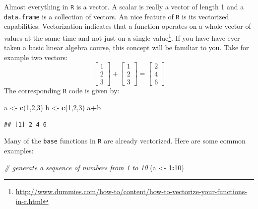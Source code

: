 \documentclass[]{book}
\makeatletter
\newenvironment{Shaded}{\begin{snugshade}}{\end{snugshade}}
\newcommand{\KeywordTok}[1]{\textcolor[rgb]{0.13,0.29,0.53}{\textbf{#1}}}
\newcommand{\DecValTok}[1]{\textcolor[rgb]{0.00,0.00,0.81}{#1}}
\newcommand{\StringTok}[1]{\textcolor[rgb]{0.31,0.60,0.02}{#1}}
\newcommand{\CommentTok}[1]{\textcolor[rgb]{0.56,0.35,0.01}{\textit{#1}}}
\newcommand{\OperatorTok}[1]{\textcolor[rgb]{0.81,0.36,0.00}{\textbf{#1}}}
\newcommand{\NormalTok}[1]{#1}
\let\rmarkdownfootnote\footnote%
\def\footnote{\protect\rmarkdownfootnote}
\newenvironment{kframe}{%
\medskip{}
\setlength{\fboxsep}{.8em}
 \def\at@end@of@kframe{}%
 \ifinner\ifhmode%
  \def\at@end@of@kframe{\end{minipage}}%
  \begin{minipage}{\columnwidth}%
 \fi\fi%
 \def\FrameCommand##1{\hskip\@totalleftmargin \hskip-\fboxsep
 \colorbox{shadecolor}{##1}\hskip-\fboxsep
     \hskip-\linewidth \hskip-\@totalleftmargin \hskip\columnwidth}%
 \MakeFramed {\advance\hsize-\width
   \@totalleftmargin\z@ \linewidth\hsize
   \@setminipage}}%
 {\par\unskip\endMakeFramed%
 \at@end@of@kframe}
\renewenvironment{Shaded}{\begin{kframe}}{\end{kframe}}
\theoremstyle{definition}
\theoremstyle{definition}
\theoremstyle{definition}
\theoremstyle{remark}
\makeatother
\begin{document}
Almost everything in \texttt{R} is a vector. A scalar is really a vector
of length 1 and a \texttt{data.frame} is a collection of vectors. An
nice feature of \texttt{R} is its vectorized capabilities. Vectorization
indicates that a function operates on a whole vector of values at the
same time and not just on a single value\footnote{\url{http://www.dummies.com/how-to/content/how-to-vectorize-your-functions-in-r.html}}.
If you have have ever taken a basic linear algebra course, this concept
will be familiar to you. \newline  \vspace{0.1in} Take for example two
vectors: \newline
\vspace{0.1in} \[
\begin{bmatrix} 1 \\ 2 \\ 3 \end{bmatrix} + 
\begin{bmatrix} 1 \\ 2 \\ 3 \end{bmatrix} =
\begin{bmatrix} 2 \\ 4 \\ 6 \end{bmatrix}
\] \newline  \vspace{0.1in} The corresponding \texttt{R} code is given
by:

\begin{Shaded}
\begin{Highlighting}[]
\NormalTok{a <-}\StringTok{ }\KeywordTok{c}\NormalTok{(}\DecValTok{1}\NormalTok{,}\DecValTok{2}\NormalTok{,}\DecValTok{3}\NormalTok{)}
\NormalTok{b <-}\StringTok{ }\KeywordTok{c}\NormalTok{(}\DecValTok{1}\NormalTok{,}\DecValTok{2}\NormalTok{,}\DecValTok{3}\NormalTok{)}
\NormalTok{a}\OperatorTok{+}\NormalTok{b}
\end{Highlighting}
\end{Shaded}

\begin{verbatim}
## [1] 2 4 6
\end{verbatim}

Many of the \texttt{base} functions in \texttt{R} are already
vectorized. Here are some common examples:

\begin{Shaded}
\begin{Highlighting}[]
\CommentTok{# generate a sequence of numbers from 1 to 10}
\NormalTok{(a <-}\StringTok{ }\DecValTok{1}\OperatorTok{:}\DecValTok{10}\NormalTok{)}
\end{Highlighting}
\end{Shaded}
\end{document}
